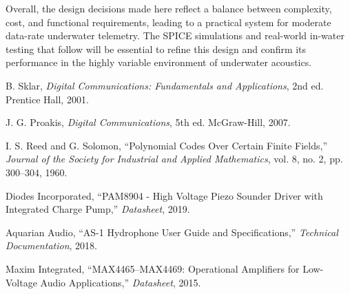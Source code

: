 Overall, the design decisions made here reflect a balance between complexity, cost, and functional requirements, leading to a practical system for moderate data-rate underwater telemetry. The SPICE simulations and real-world in-water testing that follow will be essential to refine this design and confirm its performance in the highly variable environment of underwater acoustics.

\vspace{0.5cm}
\begin{thebibliography}{99}
B. Sklar, \emph{Digital Communications: Fundamentals and Applications}, 2nd ed. Prentice Hall, 2001.

J. G. Proakis, \emph{Digital Communications}, 5th ed. McGraw-Hill, 2007.

I. S. Reed and G. Solomon, ``Polynomial Codes Over Certain Finite Fields,'' \emph{Journal of the Society for Industrial and Applied Mathematics}, vol. 8, no. 2, pp. 300--304, 1960.

Diodes Incorporated, ``PAM8904 - High Voltage Piezo Sounder Driver with Integrated Charge Pump,'' \emph{Datasheet}, 2019.

Aquarian Audio, ``AS-1 Hydrophone User Guide and Specifications,'' \emph{Technical Documentation}, 2018.

Maxim Integrated, ``MAX4465–MAX4469: Operational Amplifiers for Low-Voltage Audio Applications,'' \emph{Datasheet}, 2015.

\end{thebibliography}


